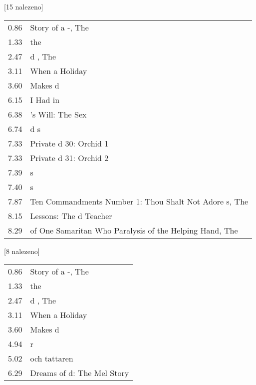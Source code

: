 \begin{table}[ht!]
\begin{tt}

\horizlina

\noindent
\begin{minipage}[t]{.5\textwidth}\vspace{0pt}
 [15 nalezeno]\vspace{5pt}

\begin{tabulary}{1.1\textwidth}{LL}
0.86 & Story of a -, The \\
1.33 &  the  \\
2.47 & d , The \\
3.11 & When   a Holiday \\
3.60 &  Makes d \\
6.15 & I Had  in  \\
6.38 & 's Will: The Sex  \\
6.74 & d s \\
7.33 & Private d 30:  Orchid 1 \\
7.33 & Private d 31:  Orchid 2 \\
7.39 &  s \\
7.40 &  s \\
7.87 & Ten Commandments Number 1: Thou Shalt Not Adore  s, The \\
8.15 &  Lessons: The d Teacher \\
8.29 &  of One Samaritan Who  Paralysis of the Helping Hand, The \\
\end{tabulary}
\end{minipage}
\begin{minipage}[t]{.5\textwidth}\vspace{0pt}
 [8 nalezeno]\vspace{5pt}

\begin{tabulary}{1.1\textwidth}{LL}
0.86 & Story of a -, The \\
1.33 &  the  \\
2.47 & d , The \\
3.11 & When   a Holiday \\
3.60 &  Makes d \\
4.94 &  r \\
5.02 &   och tattaren \\
6.29 & Dreams of d: The Mel  Story \\
\end{tabulary}
\end{minipage}


\end{tt}
\end{table}
